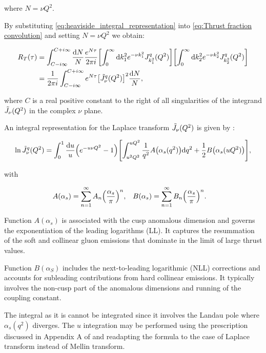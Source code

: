 \documentclass[../Tesi_Jiahao_Miao_986136.tex]{subfiles}
\begin{document}
where $N=\nu Q^2$.

By substituting \cref{eq:heaviside_integral_representation} into \cref{eq:Thrust fraction convolution} and setting $N= \nu Q^2$ we obtain:

\begin{align}
    \begin{split} \label{eq:Thrust fraction}
    R_T(\tau) &= \int_{C - i \infty}^{C + i\infty} \frac{\dd N}{N} \frac{e^{N \tau}}{2\pi i} \qty[\int_0^\infty \dd k_1^2 e^{-\nu k_1^2} J^q_{k_1^2}(Q^2) ] \qty[\int_0^\infty \dd k_2^2 e^{-\nu k_2^2} J^q_{k_2^2}(Q^2)]\\
    &=\frac{1}{2\pi i}\int_{C - i \infty}^{C + i\infty} e^{N \tau} \qty[\Tilde{J}_\nu^q(Q^2)]^2 \frac{\dd N}{N},
    \end{split}
\end{align}

where $C$ is a real positive constant to the right of all singularities of the integrand $\Tilde{J}_\nu(Q^2)$ in the complex $\nu$ plane. 

An integral representation for the Laplace transform $\Tilde{J}_\nu(Q^2)$ is given by \cite{CATANI19933}:

\begin{equation}
    \ln \Tilde{J}_\nu^q(Q^2) = \int_0^1 \frac{\dd u}{u} \qty(e^{-u \nu Q^2}-1)\qty[ \int_{u^2 Q^2}^{u Q^2} \frac{1}{q^2} A\qty(\alpha_s(q^2)) \dd q^2 + \frac{1}{2} B\qty(\alpha_s(u Q^2))],
\end{equation}

with 

\begin{align*}
    A(\alpha_s) &= \sum_{n=1}^\infty A_n \qty(\frac{\alpha_s}{\pi})^n , & B(\alpha_s) &= \sum_{n=1}^\infty B_n\qty(\frac{\alpha_s}{\pi})^n .
\end{align*}

Function $A(\alpha_s)$ is associated with the cusp anomalous dimension and governs the exponentiation of the leading logarithms (LL). 
It captures the resummation of the soft and collinear gluon emissions that dominate in the limit of large thrust values.

Function $B(\alpha_S)$ includes the next-to-leading logarithmic (NLL) corrections and accounts for subleading contributions from hard collinear emissions.
It typically involves the non-cusp part of the anomalous dimensions and running of the coupling constant.

The integral as it is cannot be integrated since it involves the Landau pole where $\alpha_s(q^2)$ diverges. The $u$ integration may be performed using the prescription discussed in Appendix A of \cite{Catani_2003_appendix} and
readapting the formula to the case of Laplace transform instead of Mellin transform.
\end{document}
